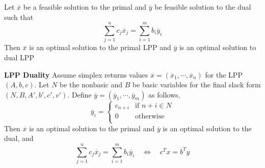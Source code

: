 \documentclass[11pt]{article}
\begin{document}
\begin{corollary*}
    Let $\overline{x}$ be a feasible solution to the primal and $\overline{y}$ be feasible solution to the dual such that 
    \[
        \sum_{j=1}^n c_j \overline{x}_j = \sum_{i=1}^m b_i \overline{y}_i
    \]
    Then $\overline{x}$ is an optimal solution to the primal LPP and $\overline{y}$ is an optimal solution to dual LPP
\end{corollary*}

\begin{theorem*}
    \textbf{LPP Duality} Assume simplex returns values $\overline{x }= ( \overline{x}_1, \cdots, \overline{x}_n)$ for the LPP $(A,b,c)$. Let $N$ be the nonbasic and $B$ be basic variables for the final slack form $(N, B, A', b', c', v')$. Define $\overline{y} = (\overline{y}_1,\cdots, \overline{y}_m)$ as follows,
     \[
        \overline{y}_i = 
        \begin{cases}
            c_{n+i} & \text{if } n + i \in N \\
            0 & \text{otherwise}            \\ 
        \end{cases}
     \]
     Then $\overline{x}$ is an optimal solution to the primal and $\overline{y}$ is an optimal solution to the dual, and 
     \[
        \sum_{j=1}^n c_j \overline{x}_j = \sum_{i=1}^m b_i \overline{y}_i \quad \iff \quad c^T x = b^T y
     \]
\end{theorem*}
\end{document}
